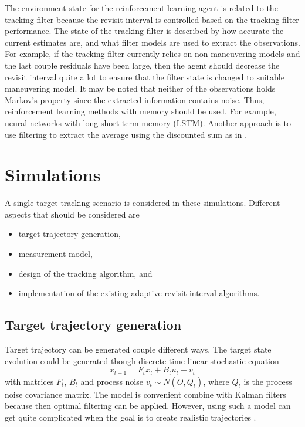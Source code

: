 \documentclass[11pt,a4paper]{article}
\begin{document}
The environment state for the reinforcement learning agent is related to the tracking filter because the revisit interval is controlled based on the tracking filter performance.
The state of the tracking filter is described by how accurate the current estimates are, and what filter models are used to extract the observations.
For example, if the tracking filter currently relies on non-maneuvering models and the last couple residuals have been large, then the agent should decrease the revisit interval quite a lot to ensure that the filter state is changed to suitable maneuvering model. 
It may be noted that neither of the observations holds Markov's property since the extracted information contains noise.
Thus, reinforcement learning methods with memory should be used.
For example, neural networks with long short-term memory (LSTM).
Another approach is to use filtering to extract the average using the discounted sum as in \cite{Munu1992}.

\newpage
\section{Simulations}

A single target tracking scenario is considered in these simulations.
Different aspects that should be considered are
\begin{itemize}
    \item target trajectory generation,
    \item measurement model,
    \item design of the tracking algorithm, and
    \item implementation of the existing adaptive revisit interval algorithms.
\end{itemize}

\subsection{Target trajectory generation}

Target trajectory can be generated couple different ways.
The target state evolution could be generated though discrete-time linear stochastic equation \cite{Bar-Shalom2001}
\begin{equation}
    x_{t+1} = F_t x_t + B_t u_t + v_t
\end{equation}
with matrices $F_t$, $B_t$ and process noise $v_t \sim N(O, Q_t)$, where $Q_t$ is the process noise covariance matrix.
The model is convenient combine with Kalman filters because then optimal filtering can be applied.
However, using such a model can get quite complicated when the goal is to create realistic trajectories \cite{RongLi2003}.
\end{document}
